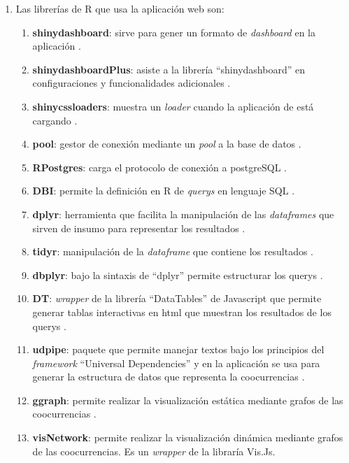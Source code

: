 \documentclass[
  12pt,
  openany]{book}
\begin{document}
\begin{enumerate}
\def\labelenumi{\arabic{enumi}.}
\item
  Las librerías de R que usa la aplicación web son:

  \begin{enumerate}
  \def\labelenumii{\arabic{enumii}.}
  \item
    \textbf{shinydashboard}: sirve para gener un formato de \emph{dashboard} en la aplicación \citep{shinydashboard}.
  \item
    \textbf{shinydashboardPlus}: asiste a la librería ``shinydashboard'' en configuraciones y funcionalidades adicionales \citep{shinydashboardPlus}.
  \item
    \textbf{shinycssloaders}: muestra un \emph{loader} cuando la aplicación de está cargando \citep{shinycssloaders}.
  \item
    \textbf{pool}: gestor de conexión mediante un \emph{pool} a la base de datos \citep{pool}.
  \item
    \textbf{RPostgres}: carga el protocolo de conexión a postgreSQL \citep{RPostgres}.
  \item
    \textbf{DBI}: permite la definición en R de \emph{querys} en lenguaje SQL \citep{DBI}.
  \item
    \textbf{dplyr}: herramienta que facilita la manipulación de las \emph{dataframes} que sirven de insumo para representar los resultados \citep{dplyr}.
  \item
    \textbf{tidyr}: manipulación de la \emph{dataframe} que contiene los resultados \citep{tidyr}.
  \item
    \textbf{dbplyr}: bajo la sintaxis de ``dplyr'' permite estructurar los querys \citep{dbplyr}.
  \item
    \textbf{DT}: \emph{wrapper} de la librería ``DataTables'' de Javascript que permite generar tablas interactivas en html que muestran los resultados de los querys \citep{DT-2}.
  \item
    \textbf{udpipe}: paquete que permite manejar textos bajo los principios del \emph{framework} ``Universal Dependencies'' y en la aplicación se usa para generar la estructura de datos que representa la coocurrencias \citep{udpipe-3}.
  \item
    \textbf{ggraph}: permite realizar la visualización estática mediante grafos de las coocurrencias \citep{ggraph-2}.
  \item
    \textbf{visNetwork}: permite realizar la visualización dinámica mediante grafos de las coocurrencias. Es un \emph{wrapper} de la libraría Vis.Js.

\end{enumerate}
\end{enumerate}
\end{document}
